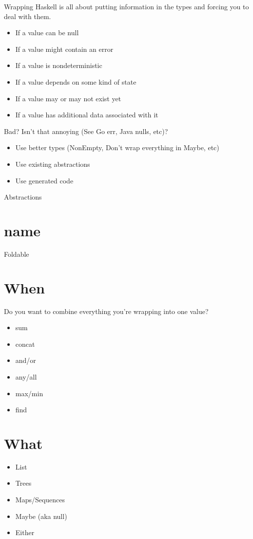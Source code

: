 \documentclass[10pt]{beamer}
\begin{document}
\begin{frame}[fragile]{Wrapping}
  Haskell is all about putting information in the types and forcing you to deal
  with them.
  \begin{itemize}
    \item If a value can be null
    \item If a value might contain an error
    \item If a value is nondeterministic
    \item If a value depends on some kind of state
    \item If a value may or may not exist yet
    \item If a value has additional data associated with it
  \end{itemize}
\end{frame}

\begin{frame}[fragile]{Bad?}
  Isn't that annoying (See Go err, Java nulls, etc)?
  \pause
  \begin{itemize}
    \item Use better types (NonEmpty, Don't wrap everything in Maybe, etc)
    \item Use existing abstractions
    \item Use generated code
  \end{itemize}
\end{frame}

\begin{frame}[fragile]{Abstractions}
  \section*{name}
  Foldable

  \section*{When}
  Do you want to combine everything you're wrapping into one value?

  \begin{itemize}
    \item sum
    \item concat
    \item and/or
    \item any/all
    \item max/min
    \item find
  \end{itemize}

  \section*{What}
  \begin{itemize}
    \item List
    \item Trees
    \item Maps/Sequences
    \item Maybe (aka null)
    \item Either
  \end{itemize}
\end{frame}
\end{document}
